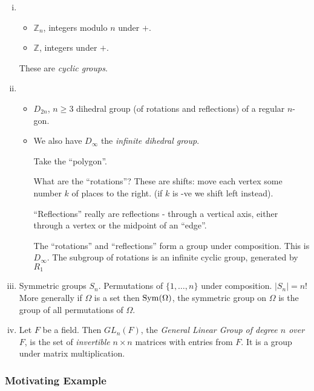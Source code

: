 \documentclass{article}
\theoremstyle{definition} \newtheorem*{definition}{Definition}
\begin{document}
\begin{exmps}\hfill \begin{enumerate}[(i)] \item \begin{itemize} \item
            $\mathbb{Z}_n$, integers modulo $n$ under $+$.  \item $\mathbb{Z}$,
            integers under $+$.  \end{itemize} These are \emph{cyclic groups}.
      \item \begin{itemize} \item $D_{2n}$, $n \geq 3$ dihedral group (of
            rotations and reflections) of a regular $n$-gon.  \item We also
              have $D_\infty$ the \emph{infinite dihedral group}.

Take the ``polygon''.

What are the ``rotations''? These are shifts: move each vertex some number $k$
of places to the right. (if $k$ is -ve we shift left instead). 

``Reflections'' really are reflections - through a vertical axis, either
through a vertex or the midpoint of an ``edge''.

The ``rotations'' and ``reflections'' form a group under composition. This is
$D_\infty$. The subgroup of rotations is an infinite cyclic group, generated by
$R_1$

\end{itemize} \item Symmetric groups $S_n$. Permutations of $\{1, \ldots, n\}$
  under composition. $|S_n| = n!$ More generally if $\Omega$ is a set then
  $\operatorname{Sym}(\Omega)$, the symmetric group on $\Omega$ is the group of all
  permutations of $\Omega$.

\item Let $F$ be a field. Then $GL_n(F)$, the \emph{General Linear Group of
  degree $n$ over $F$}, is the set of \emph{invertible} $n \times n$ matrices
  with entries from $F$. It is a group under matrix multiplication.
  \end{enumerate}
  
\end{exmps}

\subsubsection*{Motivating Example}
\end{document}
